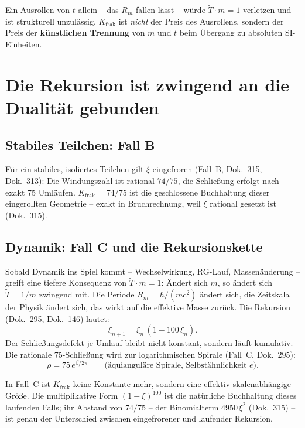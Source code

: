 Ein Ausrollen von $t$ allein -- das $R_m$ fallen lässt -- würde
$\tilde{T}\cdot m=1$ verletzen und ist strukturell unzulässig.
$K_{\text{frak}}$ ist \emph{nicht} der Preis des Ausrollens, sondern
der Preis der \textbf{künstlichen Trennung} von $m$ und $t$ beim
Übergang zu absoluten SI-Einheiten.

\section{Die Rekursion ist zwingend an die Dualität gebunden}

\subsection{Stabiles Teilchen: Fall B}

Für ein stabiles, isoliertes Teilchen gilt $\xi$ eingefroren
(Fall~B, Dok.~315, Dok.~313): Die Windungszahl ist rational $74/75$,
die Schließung erfolgt nach exakt 75 Umläufen. $K_{\text{frak}}=74/75$
ist die geschlossene Buchhaltung dieser eingerollten Geometrie --
exakt in Bruchrechnung, weil $\xi$ rational gesetzt ist (Dok.~315).

\subsection{Dynamik: Fall C und die Rekursionskette}

Sobald Dynamik ins Spiel kommt -- Wechselwirkung, RG-Lauf,
Massenänderung -- greift eine tiefere Konsequenz von
$\tilde{T}\cdot m=1$: Ändert sich $m$, so ändert sich $\tilde{T}=1/m$
zwingend mit. Die Periode $R_m=\hbar/(mc^2)$ ändert sich, die
Zeitskala der Physik ändert sich, das wirkt auf die effektive Masse
zurück. Die Rekursion (Dok.~295, Dok.~146) lautet:
\[
  \xi_{n+1} = \xi_n\,(1-100\,\xi_n).
\]
Der Schließungsdefekt je Umlauf bleibt nicht konstant, sondern läuft
kumulativ. Die rationale 75-Schließung wird zur logarithmischen Spirale
(Fall~C, Dok.~295):
\[
  \rho = 75\,e^{\beta/2\pi}
  \qquad\text{(äquianguläre Spirale, Selbstähnlichkeit }e\text{)}.
\]

In Fall~C ist $K_{\text{frak}}$ keine Konstante mehr, sondern eine
effektiv skalenabhängige Größe. Die multiplikative Form
$(1-\xi)^{100}$ ist die natürliche Buchhaltung dieses laufenden Falls;
ihr Abstand von $74/75$ -- der Binomialterm $4950\,\xi^2$ (Dok.~315)
-- ist genau der Unterschied zwischen eingefrorener und laufender
Rekursion.

